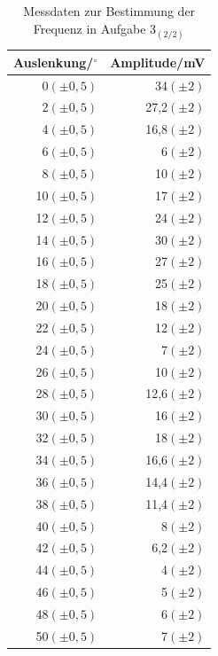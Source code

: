 \documentclass[12pt]{scrartcl}
\begin{document}
\begin{table}[H]
\caption{Messdaten zur Bestimmung der Frequenz in Aufgabe 3$_{(2/2)}$}
\begin{center}
\begin{tabular}{|r|r|}
\hline
Auslenkung/$^\circ$ & Amplitude/mV \\ \hline
0$(\pm 0,5)$ & 34$(\pm 2)$ \\ \hline
2$(\pm 0,5)$ & 27,2$(\pm 2)$ \\ \hline
4$(\pm 0,5)$ & 16,8$(\pm 2)$ \\ \hline
6$(\pm 0,5)$ & 6$(\pm 2)$ \\ \hline
8$(\pm 0,5)$ & 10$(\pm 2)$ \\ \hline
10$(\pm 0,5)$ & 17$(\pm 2)$ \\ \hline
12$(\pm 0,5)$ & 24$(\pm 2)$ \\ \hline
14$(\pm 0,5)$ & 30$(\pm 2)$ \\ \hline
16$(\pm 0,5)$ & 27$(\pm 2)$ \\ \hline
18$(\pm 0,5)$ & 25$(\pm 2)$ \\ \hline
20$(\pm 0,5)$ & 18$(\pm 2)$ \\ \hline
22$(\pm 0,5)$ & 12$(\pm 2)$ \\ \hline
24$(\pm 0,5)$ & 7$(\pm 2)$ \\ \hline
26$(\pm 0,5)$ & 10$(\pm 2)$ \\ \hline
28$(\pm 0,5)$ & 12,6$(\pm 2)$ \\ \hline
30$(\pm 0,5)$ & 16$(\pm 2)$ \\ \hline
32$(\pm 0,5)$ & 18$(\pm 2)$ \\ \hline
34$(\pm 0,5)$ & 16,6$(\pm 2)$ \\ \hline
36$(\pm 0,5)$ & 14,4$(\pm 2)$ \\ \hline
38$(\pm 0,5)$ & 11,4$(\pm 2)$ \\ \hline
40$(\pm 0,5)$ & 8$(\pm 2)$ \\ \hline
42$(\pm 0,5)$ & 6,2$(\pm 2)$ \\ \hline
44$(\pm 0,5)$ & 4$(\pm 2)$ \\ \hline
46$(\pm 0,5)$ & 5$(\pm 2)$ \\ \hline
48$(\pm 0,5)$ & 6$(\pm 2)$ \\ \hline
50$(\pm 0,5)$ & 7$(\pm 2)$ \\ \hline
\end{tabular}
\end{center}
\label{tab:aufgabe3_2}
\end{table}
\end{document}
